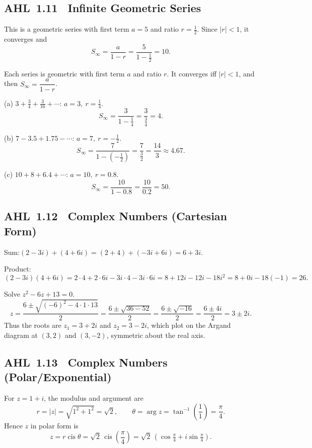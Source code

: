 \documentclass[11pt]{article}
\def\textbf#1{#1}%
\newcommand{\tocsubsection}[1]{\subsection{#1}}
\begin{document}
\tocsubsection{AHL 1.11 \; Infinite Geometric Series}


\begin{solution}
This is a geometric series with first term \(a=5\) and ratio \(r=\tfrac12\).
Since \(|r|<1\), it converges and
\[
S_\infty=\frac{a}{1-r}=\frac{5}{1-\frac12}=10.
\]
\end{solution}


\begin{solution}
Each series is geometric with first term \(a\) and ratio \(r\). It converges iff \(|r|<1\), and then \(S_\infty=\dfrac{a}{1-r}\).

\medskip
\textbf{(a)} \(3+\tfrac34+\tfrac{3}{16}+\cdots\): \(a=3,\ r=\tfrac14\).
\[
S_\infty=\frac{3}{1-\frac14}=\frac{3}{\frac34}=4.
\]

\textbf{(b)} \(7-3.5+1.75-\cdots\): \(a=7,\ r=-\tfrac12\).
\[
S_\infty=\frac{7}{1-(-\frac12)}=\frac{7}{\frac32}=\frac{14}{3}\approx4.67.
\]

\textbf{(c)} \(10+8+6.4+\cdots\): \(a=10,\ r=0.8\).
\[
S_\infty=\frac{10}{1-0.8}=\frac{10}{0.2}=50.
\]
\end{solution}


\tocsubsection{AHL 1.12 \; Complex Numbers (Cartesian Form)}

\begin{solution}
\textbf{Sum:}\quad $(2-3i)+(4+6i) = (2+4) + (-3i+6i) = 6+3i$.

\medskip
\textbf{Product:}\quad 
\[
(2-3i)(4+6i) 
= 2\cdot4 + 2\cdot6i - 3i\cdot4 - 3i\cdot6i
= 8 + 12i - 12i - 18i^{2}
= 8 + 0i - 18(-1)
= 26.
\]
\end{solution}

\begin{solution}
Solve \(z^{2}-6z+13=0\).
\[
z=\frac{6\pm\sqrt{(-6)^{2}-4\cdot1\cdot13}}{2}
= \frac{6\pm\sqrt{36-52}}{2}
= \frac{6\pm\sqrt{-16}}{2}
= \frac{6\pm 4i}{2}
= 3\pm 2i.
\]
Thus the roots are \(z_1=3+2i\) and \(z_2=3-2i\), which plot on the Argand diagram at
\((3,2)\) and \((3,-2)\), symmetric about the real axis.
\end{solution}

\tocsubsection{AHL 1.13 \; Complex Numbers (Polar/Exponential)}

\begin{solution}
For \(z=1+i\), the modulus and argument are
\[
r=\lvert z\rvert=\sqrt{1^{2}+1^{2}}=\sqrt{2},\qquad
\theta=\arg z=\tan^{-1}\!\left(\frac{1}{1}\right)=\frac{\pi}{4}.
\]
Hence \(z\) in polar form is
\[
z=r\operatorname{cis}\theta=\sqrt{2}\,\operatorname{cis}\!\left(\frac{\pi}{4}\right)
=\sqrt{2}\,(\cos\tfrac{\pi}{4}+i\sin\tfrac{\pi}{4}).
\]
\end{solution}
\end{document}
